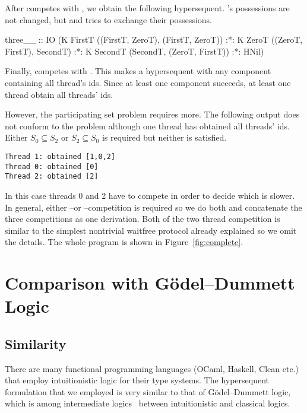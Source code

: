 After \verb@SecondT@ competes with \verb@ZeroT@, we obtain the following
hypersequent.  \verb@FirstT@'s possessions are not changed, but \verb@ZeroT@ and
\verb@SecondT@ tries to exchange their possessions.
\begin{spec}
three__ :: IO
  (K FirstT ((FirstT, ZeroT), (FirstT, ZeroT)) :*:
   K ZeroT ((ZeroT, FirstT), SecondT) :*:
   K SecondT (SecondT, (ZeroT, FirstT)) :*: HNil)
\end{spec}
Finally, \verb@SecondT@ competes with \verb@FirstT@.  This makes a hypersequent with
any component containing all thread's ids.  Since at least one component succeeds,
at least one thread obtain all threads' ids.

However, the participating set problem requires more.  The following
output does not conform to the problem although one thread has obtained
all threads' ids.  Either $S_0 \subseteq S_2$ or $S_2\subseteq S_0$ is
required but neither is satisfied.
\begin{verbatim}
Thread 1: obtained [1,0,2]
Thread 0: obtained [0]
Thread 2: obtained [2]
\end{verbatim}
In this case threads 0 and 2 have to compete in order to decide which
is slower.  In general, either \verb@ZeroT@--\verb@SecondT@ or
\verb@FirstT@--\verb@SecondT@ competition is required so we do both and
concatenate the three competitions as one derivation.
Both of the two thread competition is similar to the simplest nontrivial
waitfree protocol already explained so we omit the details.  The whole
program is shown in Figure~\ref{fig:complete}.


\section{Comparison with G\"odel--Dummett Logic}


\subsection{Similarity}

There are many functional programming languages (OCaml, Haskell, Clean
etc.) that employ intuitionistic logic for their type systems.
The hypersequent formulation that we employed is very similar to that of
G\"odel--Dummett logic, which is among
intermediate logics~\citep{umezawa} between intuitionistic and
classical logics.

